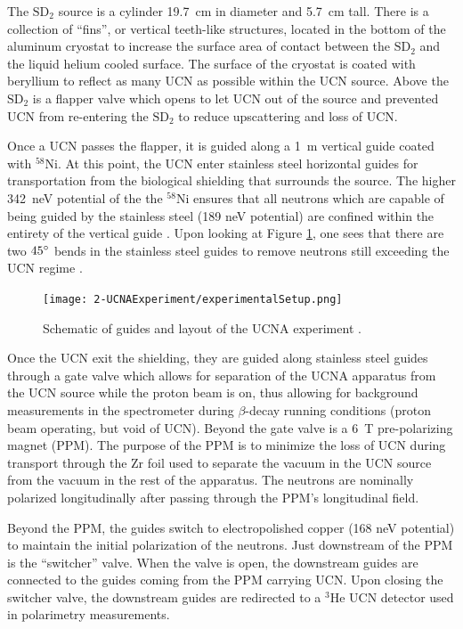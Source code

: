 The $\mathrm{SD}_2$ source is a cylinder 19.7~cm in diameter and 5.7~cm tall. There
is a collection of ``fins'', or vertical teeth-like structures, located in
the bottom of the aluminum cryostat to increase the surface area of contact between the
$\mathrm{SD}_2$ and the liquid helium cooled surface. The surface of the cryostat
is coated with beryllium to reflect as many UCN as possible within the UCN source. Above
the $\mathrm{SD}_2$ is a flapper valve which opens to let UCN out of the source and
prevented UCN from re-entering the $\mathrm{SD}_2$ to reduce upscattering and loss of UCN.

Once a UCN passes the flapper, it is guided along a 1~m vertical guide coated with $^{58}\mathrm{Ni}$.
At this point, the UCN enter stainless steel horizontal guides for transportation from
the biological shielding that surrounds the source. The higher 342~neV potential of the
the $^{58}\mathrm{Ni}$ ensures that all neutrons which are capable of being guided by the
stainless steel (189 neV potential) are confined within the entirety of the vertical guide
\cite{saunders2013performance}. Upon looking at Figure \ref{fig:guides}, one sees that
there are two $45\degree$ bends in the stainless steel guides to remove neutrons still
exceeding the UCN regime \cite{plaster2012}.

\begin{figure}[h]
  \centering
  \texttt{[image: 2-UCNAExperiment/experimentalSetup.png]} 
  \caption{Schematic of guides and layout of the UCNA experiment \cite{plaster2012}.}
  \label{fig:guides}
\end{figure}

Once the UCN exit the shielding, they are guided along stainless steel guides
through a gate valve which allows for separation of the UCNA apparatus from the UCN
source while the proton beam is on, thus allowing for background measurements in
the spectrometer
during $\beta$-decay running conditions (proton beam operating, but void of UCN).
Beyond the gate valve is a 6~T pre-polarizing magnet (PPM). The purpose of the PPM
is to minimize the loss of UCN during transport through the Zr foil used to separate
the vacuum in the UCN source from the vacuum in the rest of the apparatus. The neutrons
are nominally polarized longitudinally after passing through the PPM's longitudinal field.

Beyond the PPM, the guides switch to electropolished copper (168 neV potential) to
maintain the initial polarization of the neutrons. Just downstream of the PPM
is the ``switcher'' valve. When the valve is open, the downstream guides are connected
to the guides coming from the PPM carrying UCN. Upon closing the switcher valve,
the downstream guides are redirected to a $^3\mathrm{He}$ 
UCN detector \cite{morris2009multi} used in polarimetry measurements.

